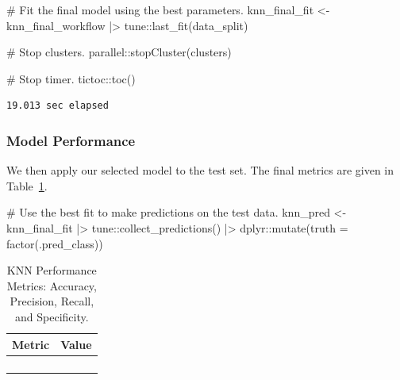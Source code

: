 \documentclass[
  letterpaper,
  DIV=11,
  numbers=noendperiod]{scrartcl}
\newenvironment{Shaded}{\begin{snugshade}}{\end{snugshade}}
\newcommand{\AttributeTok}[1]{\textcolor[rgb]{0.40,0.45,0.13}{#1}}
\newcommand{\CommentTok}[1]{\textcolor[rgb]{0.37,0.37,0.37}{#1}}
\newcommand{\FunctionTok}[1]{\textcolor[rgb]{0.28,0.35,0.67}{#1}}
\newcommand{\NormalTok}[1]{\textcolor[rgb]{0.00,0.23,0.31}{#1}}
\newcommand{\OtherTok}[1]{\textcolor[rgb]{0.00,0.23,0.31}{#1}}
\newcommand{\SpecialCharTok}[1]{\textcolor[rgb]{0.37,0.37,0.37}{#1}}
\begin{document}
\begin{Shaded}
\begin{Highlighting}[]
\CommentTok{\# Fit the final model using the best parameters.}
\NormalTok{knn\_final\_fit }\OtherTok{\textless{}{-}} 
\NormalTok{  knn\_final\_workflow }\SpecialCharTok{|\textgreater{}} 
\NormalTok{  tune}\SpecialCharTok{::}\FunctionTok{last\_fit}\NormalTok{(data\_split)}

\CommentTok{\# Stop clusters.}
\NormalTok{parallel}\SpecialCharTok{::}\FunctionTok{stopCluster}\NormalTok{(clusters)}

\CommentTok{\# Stop timer.}
\NormalTok{tictoc}\SpecialCharTok{::}\FunctionTok{toc}\NormalTok{()}
\end{Highlighting}
\end{Shaded}

\begin{verbatim}
19.013 sec elapsed
\end{verbatim}

\subsubsection{Model Performance}\label{model-performance}

We then apply our selected model to the test set. The final metrics are
given in Table~\ref{tbl-knn-performance-pdf}.

\begin{Shaded}
\begin{Highlighting}[]
\CommentTok{\# Use the best fit to make predictions on the test data.}
\NormalTok{knn\_pred }\OtherTok{\textless{}{-}} 
\NormalTok{  knn\_final\_fit }\SpecialCharTok{|\textgreater{}} 
\NormalTok{  tune}\SpecialCharTok{::}\FunctionTok{collect\_predictions}\NormalTok{() }\SpecialCharTok{|\textgreater{}}
\NormalTok{  dplyr}\SpecialCharTok{::}\FunctionTok{mutate}\NormalTok{(}\AttributeTok{truth =} \FunctionTok{factor}\NormalTok{(.pred\_class))}
\end{Highlighting}
\end{Shaded}

\begin{longtable}{>{\raggedright\arraybackslash}p{}>{\raggedleft\arraybackslash}p{}}

\caption{\label{tbl-knn-performance-pdf}KNN Performance Metrics:
Accuracy, Precision, Recall, and Specificity.}

\tabularnewline

\toprule
Metric & Value \\ 
\midrule\addlinespace[2.5pt]
\cellcolor[HTML]{FFFFFF}{Accuracy} & \cellcolor[HTML]{FFFFFF}{90.1} \\ 
\cellcolor[HTML]{FFFFFF}{Precision} & \cellcolor[HTML]{FFFFFF}{76.9} \\ 
\cellcolor[HTML]{FFFFFF}{Recall} & \cellcolor[HTML]{FFFFFF}{87.0} \\ 
\cellcolor[HTML]{FFFFFF}{Specificity} & \cellcolor[HTML]{FFFFFF}{91.2} \\ 
\bottomrule

\end{longtable}
\end{document}
